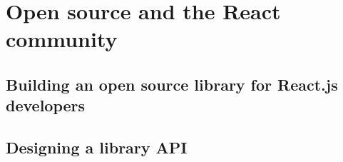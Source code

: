\chapter{Open source and the React community}
\label{cha:opensource}

\section{Building an open source library for React.js developers}

\section{Designing a library API}